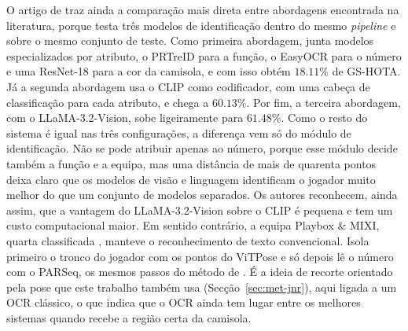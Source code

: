O artigo de \citet{oo2026broadcast2pitch} traz ainda a comparação mais direta entre abordagens encontrada na literatura, porque testa três modelos de identificação dentro do mesmo \emph{pipeline} e sobre o mesmo conjunto de teste. Como primeira abordagem, junta modelos especializados por atributo, o PRTreID para a função, o EasyOCR para o número e uma ResNet-18 para a cor da camisola, e com isso obtém $18{.}11\%$ de GS-HOTA. Já a segunda abordagem usa o CLIP como codificador, com uma cabeça de classificação para cada atributo, e chega a $60{.}13\%$. Por fim, a terceira abordagem, com o LLaMA-3.2-Vision, sobe ligeiramente para $61{.}48\%$. Como o resto do sistema é igual nas três configurações, a diferença vem só do módulo de identificação. Não se pode atribuir apenas ao número, porque esse módulo decide também a função e a equipa, mas uma distância de mais de quarenta pontos deixa claro que os modelos de visão e linguagem identificam o jogador muito melhor do que um conjunto de modelos separados. Os autores reconhecem, ainda assim, que a vantagem do LLaMA-3.2-Vision sobre o CLIP é pequena e tem um custo computacional maior. Em sentido contrário, a equipa Playbox \& MIXI, quarta classificada \citep[equipa GSR-4]{giancola2025soccernet}, manteve o reconhecimento de texto convencional. Isola primeiro o tronco do jogador com os pontos do ViTPose e só depois lê o número com o PARSeq, os mesmos passos do método de \citet{koshkina2024general}. É a ideia de recorte orientado pela pose que este trabalho também usa (Secção~\ref{sec:met-jnr}), aqui ligada a um OCR clássico, o que indica que o OCR ainda tem lugar entre os melhores sistemas quando recebe a região certa da camisola.

